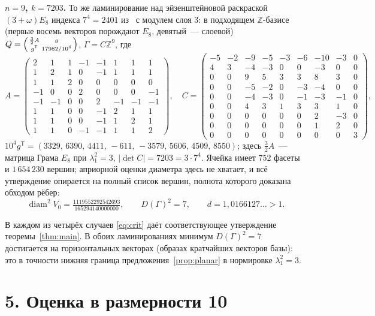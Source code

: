 \documentclass{article}
\theoremstyle{plain}
\theoremstyle{remark}
\newcommand{\Z}{\mathbb{Z}}
\newcommand{\diam}{\operatorname{diam}}
\begin{document}
{\bfseries\boldmath $n=9$, $k=7203$.} То же ламинирование над эйзенштейновой
раскраской $(3+\omega)E_8$ индекса $7^4=2401$ из~\cite{ABPR} с модулем слоя
$3$: в подходящем $\Z$-базисе (первые восемь векторов порождают $E_8$,
девятый~--- слоевой)
$Q=\Bigl(\begin{smallmatrix}\frac32A&g\\ g^{\mathsf T}&17982/10^4\end{smallmatrix}\Bigr)$,
$\Gamma=C\Z^9$, где
\[
A=\left(\begin{smallmatrix}
2&1&1&-1&-1&1&1&1\\ 1&2&1&0&-1&1&1&1\\ 1&1&2&0&0&0&0&0\\ -1&0&0&2&0&0&0&-1\\
-1&-1&0&0&2&-1&-1&-1\\ 1&1&0&0&-1&2&1&1\\ 1&1&0&0&-1&1&2&1\\ 1&1&0&-1&-1&1&1&2
\end{smallmatrix}\right),\quad
C=\left(\begin{smallmatrix}
-5&-2&-9&-5&-3&-6&-10&-3&0\\ 4&3&-4&-3&0&0&-3&0&0\\ 0&0&9&5&3&3&8&3&0\\
0&0&-5&-2&0&-3&-4&0&0\\ 0&0&-4&-3&0&-1&-3&-1&0\\ 0&0&4&3&1&3&3&1&0\\
0&0&0&0&0&0&2&-3&0\\ 0&0&0&0&0&0&1&2&0\\ 0&0&0&0&0&0&0&0&3
\end{smallmatrix}\right),
\]
$10^4g^{\mathsf T}=(3329,\,6390,\,4411,\,-611,\,-3579,\,5606,\,4509,\,8550)$;
здесь $\tfrac32A$~--- матрица Грама $E_8$ при $\lambda_1^2=3$,
$|\det C|=7203=3\cdot7^4$. Ячейка имеет $752$ фасеты и $1\,654\,230$ вершин;
априорной оценки диаметра здесь не хватает, и всё утверждение опирается на
полный список вершин, полнота которого доказана обходом рёбер:
\[
\diam^2V_0=\tfrac{1119552292542693}{165294140000000},\qquad
D(\Gamma)^2=7,\qquad d=1{,}0166127\ldots>1 .
\]

В каждом из четырёх случаев \eqref{eq:crit} даёт соответствующее
утверждение теоремы~\ref{thm:main}. В обоих ламинированиях минимум
$D(\Gamma)^2=7$ достигается на горизонтальных векторах (образах кратчайших
векторов базы): это в точности нижняя граница предложения~\ref{prop:planar}
в нормировке $\lambda_1^2=3$.

\section*{5. Оценка в размерности 10}
\end{document}
